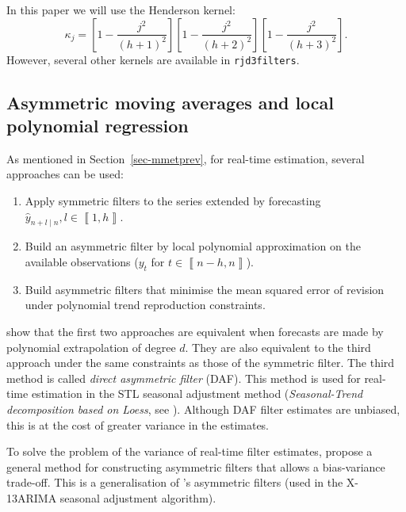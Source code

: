 \documentclass[
]{article}
\newcommand\1{\mathds{1}}
\begin{document}
In this paper we will use the Henderson kernel: \[
\kappa_{j}=\left[1-\frac{j^2}{(h+1)^2}\right]
\left[1-\frac{j^2}{(h+2)^2}\right]
\left[1-\frac{j^2}{(h+3)^2}\right].
\] However, several other kernels are available in \texttt{rjd3filters}.

\hypertarget{sec-lppasymf}{%
\subsection{Asymmetric moving averages and local polynomial
regression}\label{sec-lppasymf}}

As mentioned in Section~\ref{sec-mmetprev}, for real-time estimation,
several approaches can be used:

\begin{enumerate}
\def\labelenumi{\arabic{enumi}.}
\item
  Apply symmetric filters to the series extended by forecasting
  \(\hat{y}_{n+l\mid n},l\in\left\llbracket 1,h\right\rrbracket\).
\item
  Build an asymmetric filter by local polynomial approximation on the
  available observations (\(y_{t}\) for
  \(t\in\left\llbracket n-h,n\right\rrbracket\)).
\item
  Build asymmetric filters that minimise the mean squared error of
  revision under polynomial trend reproduction constraints.
\end{enumerate}

\textcite{proietti2008} show that the first two approaches are
equivalent when forecasts are made by polynomial extrapolation of degree
\(d\). They are also equivalent to the third approach under the same
constraints as those of the symmetric filter. The third method is called
\emph{direct asymmetric filter} (DAF). This method is used for real-time
estimation in the STL seasonal adjustment method (\emph{Seasonal-Trend
decomposition based on Loess}, see \textcite{cleveland90}). Although DAF
filter estimates are unbiased, this is at the cost of greater variance
in the estimates.

To solve the problem of the variance of real-time filter estimates,
\textcite{proietti2008} propose a general method for constructing
asymmetric filters that allows a bias-variance trade-off. This is a
generalisation of \textcite{musgrave1964set}'s asymmetric filters (used
in the X-13ARIMA seasonal adjustment algorithm).
\end{document}
